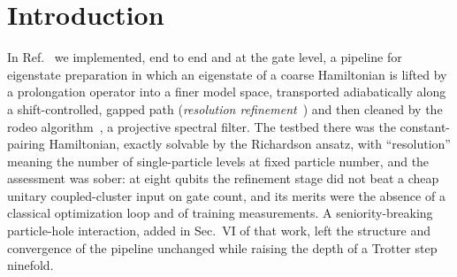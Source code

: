 \documentclass[
  aps,
  prc,
  reprint,
  superscriptaddress,
  floatfix,
  nofootinbib
]{revtex4-2}
\begin{document}
\maketitle

\section{Introduction}
In Ref.~\cite{EigenQPairing2026} we implemented, end to end and at the gate
level, a pipeline for eigenstate preparation in which an eigenstate of a
coarse Hamiltonian is lifted by a prolongation operator into a finer model
space, transported adiabatically along a shift-controlled, gapped path
(\emph{resolution refinement}~\cite{Bogner2026}) and then cleaned by the
rodeo algorithm~\cite{Choi2021,Qian2024}, a projective spectral filter.  The
testbed there was the constant-pairing Hamiltonian, exactly solvable by the
Richardson ansatz, with ``resolution'' meaning the number of single-particle
levels at fixed particle number, and the assessment was sober: at eight
qubits the refinement stage did not beat a cheap unitary coupled-cluster
input on gate count, and its merits were the absence of a classical
optimization loop and of training measurements.  A seniority-breaking
particle-hole interaction, added in Sec.~VI of that work, left the structure
and convergence of the pipeline unchanged while raising the depth of a
Trotter step ninefold.
\end{document}
